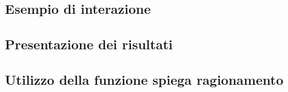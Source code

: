 \subsection{Esempio di interazione}

\subsection{Presentazione dei risultati}

\subsection{Utilizzo della funzione spiega ragionamento}
